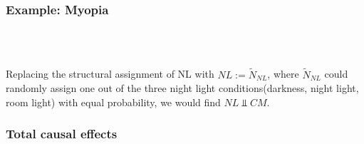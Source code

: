 \documentclass{beamer}
\begin{document}
\begin{frame}
    \frametitle{Example: Myopia} 
     \\
     \\ 
    \begin{flushleft}
        Replacing the structural assignment of NL with $NL := \tilde{N}_{NL}$, where $\tilde{N}_{NL}$ could randomly assign one 
        out of the three night light conditions(darkness, night light, room light) with equal probability, we would find $NL\Vbar CM$.
    \end{flushleft}
\end{frame}

\begin{frame}
    \frametitle{Total causal effects} 
\end{frame}
\end{document}
